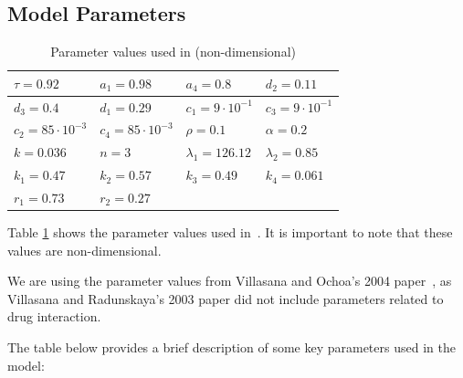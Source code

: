 \subsection{Model Parameters}

\begin{table}[ht]
\centering
\begin{tabular}{|l|l|l|l|}
\hline
$\tau = 0.92$          & $a_1 = 0.98$         & $a_4 = 0.8$            & $d_2 = 0.11$           \\ \hline
$d_3 = 0.4$            & $d_1 = 0.29$         & $c_1 = 9\cdot 10^{-1}$ & $c_3 = 9\cdot 10^{-1}$ \\ \hline
$c_2 = 85\cdot10^{-3}$ & $c_4=85\cdot10^{-3}$ & $\rho = 0.1$           & $\alpha = 0.2$         \\ \hline
$k=0.036$              & $n=3$                & $\lambda_1=126.12$     & $\lambda_2=0.85$       \\ \hline
$k_1=0.47$             & $k_2=0.57$           & $k_3=0.49$             & $k_4 = 0.061$          \\ \hline
$r_1 = 0.73$            & $r_2 = 0.27$         &                        &                        \\ \hline
\end{tabular}
\caption{Parameter values used in \cite{villasana2004} (non-dimensional)}
\label{table:parameter values}
\end{table}

Table \ref{table:parameter values} shows the parameter values used in~\cite{villasana2004}. It is important to note that these values are non-dimensional.

We are using the parameter values from Villasana and Ochoa's 2004 paper~\cite{villasana2004}, as Villasana and Radunskaya's 2003 paper did not include parameters related to drug interaction.~\cite{villasana2003}

The table below provides a brief description of some key parameters used in the model:

